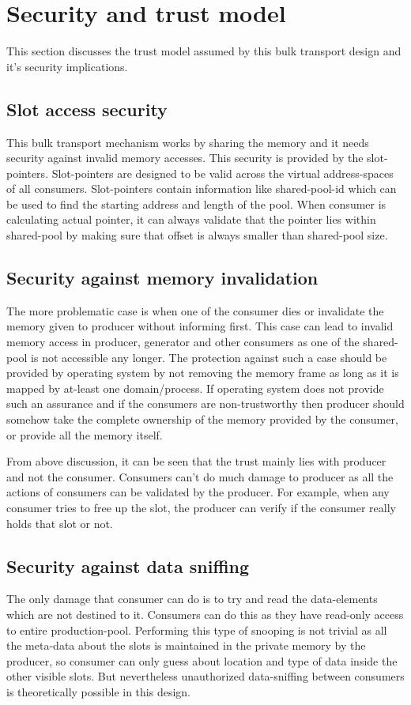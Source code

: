 \documentclass[a4paper,twoside]{report} %
\begin{document}
\section{Security and trust model}
\label{sec:security-trust}
This section discusses the trust model assumed by this bulk transport
design and it's security implications.

\subsection{Slot access security}
\label{sec:slot-security}
This bulk transport mechanism works by sharing the memory and it 
needs security against invalid memory accesses.  This security is
provided by the slot-pointers.  Slot-pointers are designed to be valid
across the virtual address-spaces of all consumers.  Slot-pointers
contain information like shared-pool-id which can be used to find the
starting address and length of the pool.  When consumer is calculating
actual pointer, it can always validate that the pointer lies within
shared-pool by making sure that offset is always smaller than
shared-pool size.

\subsection{Security against memory invalidation}
\label{sec:memory-security}
The more problematic case is when one of the consumer dies or
invalidate the memory given to producer without informing first.
This case can lead to invalid memory access in producer,
generator and other consumers as one of the shared-pool is not
accessible any longer.  The protection against such a case
should be provided by operating system by not removing the memory
frame as long as it is mapped by at-least one domain/process.  If
operating system does not provide such an assurance and if the
consumers are non-trustworthy then producer should somehow take the
complete ownership of the memory provided by the consumer, or provide
all the memory itself. 


From above discussion, it can be seen that the trust mainly lies with
producer and not the consumer.  Consumers can't do much damage to
producer as all the actions of consumers can be validated by the
producer.  For example, when any consumer tries to free up the slot, 
the producer can verify if the consumer really holds that slot or not.


\subsection{Security against data sniffing}
\label{sec:security-sniffing}
The only damage that consumer can do is to try and read the
data-elements which are not destined to it.  Consumers can do this
as they have read-only access to entire production-pool.  Performing
this type of snooping is not trivial as all the meta-data about the
slots is maintained in the private memory by the producer, so consumer
can only guess about location and type of data inside the other
visible slots.  But nevertheless unauthorized data-sniffing between
consumers is theoretically possible in this design.
\end{document}
